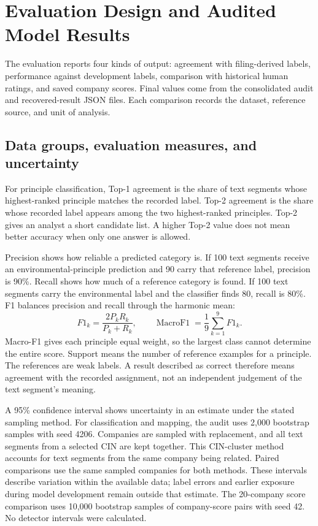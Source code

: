 \section{Evaluation Design and Audited Model Results}
\label{sec:evaluation}

The evaluation reports four kinds of output: agreement with filing-derived labels, performance against development labels, comparison with historical human ratings, and saved company scores. Final values come from the consolidated audit and recovered-result JSON files. Each comparison records the dataset, reference source, and unit of analysis.

\subsection{Data groups, evaluation measures, and uncertainty}

For principle classification, Top-1 agreement is the share of text segments whose highest-ranked principle matches the recorded label. Top-2 agreement is the share whose recorded label appears among the two highest-ranked principles. Top-2 gives an analyst a short candidate list. A higher Top-2 value does not mean better accuracy when only one answer is allowed.

Precision shows how reliable a predicted category is. If 100 text segments receive an environmental-principle prediction and 90 carry that reference label, precision is 90\%. Recall shows how much of a reference category is found. If 100 text segments carry the environmental label and the classifier finds 80, recall is 80\%. F1 balances precision and recall through the harmonic mean:
\begin{equation}
F1_k=\frac{2P_kR_k}{P_k+R_k},\qquad
\operatorname{MacroF1}=\frac{1}{9}\sum_{k=1}^{9}F1_k.
\label{eq:f1}
\end{equation}
Macro-F1 gives each principle equal weight, so the largest class cannot determine the entire score. Support means the number of reference examples for a principle. The references are weak labels. A result described as correct therefore means agreement with the recorded assignment, not an independent judgement of the text segment's meaning.

A 95\% confidence interval shows uncertainty in an estimate under the stated sampling method. For classification and mapping, the audit uses 2,000 bootstrap samples with seed 4206. Companies are sampled with replacement, and all text segments from a selected CIN are kept together. This CIN-cluster method accounts for text segments from the same company being related. Paired comparisons use the same sampled companies for both methods. These intervals describe variation within the available data; label errors and earlier exposure during model development remain outside that estimate. The 20-company score comparison uses 10,000 bootstrap samples of company-score pairs with seed 42. No detector intervals were calculated.

